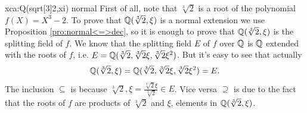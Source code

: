 \begin{sol}{xca:Q(sqrt[3]{2},xi) normal}
First of all, note that $\sqrt[3]{2}$ is a root of
the polynomial $f(X)=X^3-2$.
To prove that $\mathbb{Q}(\sqrt[3]{2},\xi)$ is a normal extension 
we use Proposition \ref{pro:normal<=>dec},
so it is enough to prove
that $\mathbb{Q}(\sqrt[3]{2},\xi)$ is the splitting field of $f$.
We know that the splitting field $E$ of $f$ over $\mathbb{Q}$ is
$\mathbb{Q}$ extended with the roots of $f$, i.e.
$E=\mathbb{Q}(\sqrt[3]{2},\sqrt[3]{2}\xi,\sqrt[3]{2}\xi^2)$.
But it's easy to see that actually 
\[
\mathbb{Q}(\sqrt[3]{2},\xi)=\mathbb{Q}(\sqrt[3]{2},\sqrt[3]{2}\xi,\sqrt[3]{2}\xi^2)=E.
\]
The inclusion $\subseteq$ is because $\sqrt[3]{2},  \xi=\frac{\sqrt[3]{2}\xi}{\sqrt[3]{2}}\in E$. 
Vice versa $\supseteq$ is due to the fact that 
the roots of $f$ are products of $\sqrt[3]{2}$ and $\xi$, elements in $\mathbb{Q}(\sqrt[3]{2},\xi)$.
\end{sol}


